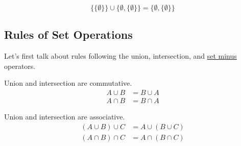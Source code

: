   \begin{example}
    \label{ex:union-of-two-small-sets}
    \begin{equation}
      \{\{\emptyset\}\} \cup \{\emptyset, \{\emptyset\}\} = \{\emptyset, \{\emptyset\}\}
    \end{equation}
  \end{example}

\subsection{Rules of Set Operations}

  Let's first talk about rules following the union, intersection, and \hyperref[def:set-minus]{set minus} operators. 

  \begin{theorem}[Commutativity]
    \label{thm:commutativity}
    Union and intersection are commutative. 
    \begin{align}
      A \cup B & = B \cup A \\
      A \cap B & = B \cap A
    \end{align}
  \end{theorem}

  \begin{theorem}[Associativity]
    \label{thm:associativity}
    Union and intersection are associative. 
    \begin{align}
      (A \cup B) \cup C & = A \cup (B \cup C) \\
      (A \cap B) \cap C & = A \cap (B \cap C) 
    \end{align}
  \end{theorem}

